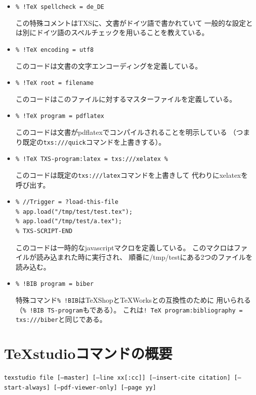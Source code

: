 \begin{itemize}
\item
  \lstinline"% !TeX spellcheck = de_DE"

  この特殊コメントはTXSに、文書がドイツ語で書かれていて
  一般的な設定とは別にドイツ語のスペルチェックを用いることを教えている。
\item
  \lstinline"% !TeX encoding = utf8"

  このコードは文書の文字エンコーディングを定義している。
\item
  \lstinline"% !TeX root = filename"

  このコードはこのファイルに対するマスターファイルを定義している。
\item
  \lstinline"% !TeX program = pdflatex"

  このコードは文書がpdflatexでコンパイルされることを明示している
  （つまり既定の\verb+txs:///quick+コマンドを上書きする）。
\item
  \lstinline"% !TeX TXS-program:latex = txs:///xelatex %"

  このコードは既定の\verb+txs:///latex+コマンドを上書きして
  代わりにxelatexを呼び出す。
\item
\begin{lstlisting}[frame=single]
% !TeX TXS-SCRIPT = foobar
% //Trigger = ?load-this-file
% app.load("/tmp/test/test.tex");
% app.load("/tmp/test/a.tex");
% TXS-SCRIPT-END
\end{lstlisting}

  このコードは一時的なjavascriptマクロを定義している。
  このマクロはファイルが読み込まれた時に実行され、
  順番に/tmp/testにある2つのファイルを読み込む。
\item
  \lstinline"% !BIB program = biber"

  特殊コマンド\verb+% !BIB+はTeXShopとTeXWorksとの互換性のために
  用いられる（\verb+% !BIB TS-program+もである）。
  これは\verb+! TeX program:bibliography = txs:///biber+と同じである。

\end{itemize}

\section{TeXstudioコマンドの概要}

\texttt{texstudio file {[}--master{]} {[}--line xx{[}:cc{]}{]} {[}--insert-cite citation{]} {[}--start-always{]} {[}--pdf-viewer-only{]} {[}--page yy{]}}


